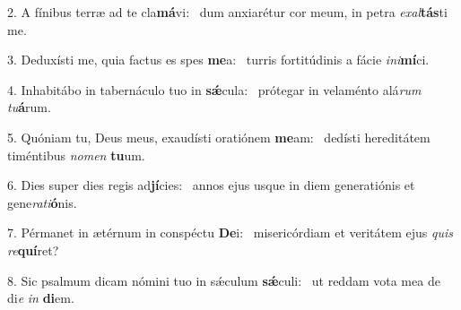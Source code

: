 2. A fínibus terræ ad te cla\textbf{má}vi: \ast\  dum anxiarétur cor meum, in petra \textit{ex}\textit{al}\textbf{tás}ti me.\

3. Deduxísti me, quia factus es spes \textbf{me}a: \ast\  turris fortitúdinis a fácie \textit{in}\textit{i}\textbf{mí}ci.\

4. Inhabitábo in tabernáculo tuo in \textbf{sǽ}cula: \ast\  prótegar in velaménto alá\textit{rum} \textit{tu}\textbf{á}rum.\

5. Quóniam tu, Deus meus, exaudísti oratiónem \textbf{me}am: \ast\  dedísti hereditátem timéntibus \textit{no}\textit{men} \textbf{tu}um.\

6. Dies super dies regis ad\textbf{jí}cies: \ast\  annos ejus usque in diem generatiónis et gene\textit{ra}\textit{ti}\textbf{ó}nis.\

7. Pérmanet in ætérnum in conspéctu \textbf{De}i: \ast\  misericórdiam et veritátem ejus \textit{quis} \textit{re}\textbf{quí}ret?\

8. Sic psalmum dicam nómini tuo in sǽculum \textbf{sǽ}culi: \ast\  ut reddam vota mea de di\textit{e} \textit{in} \textbf{di}em.\


